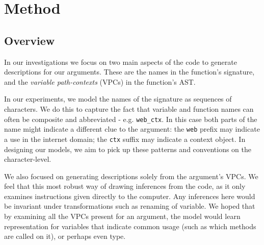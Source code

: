 \chapter{Method}
\label{the_models}



\section{Overview}

In our investigations we focus on two main aspects of the code to generate descriptions for our arguments. 
These are the names in the function's signature, and the \textit{variable path-contexts} (VPCs) in the function's AST. 


In our experiments, we model the names of the signature as sequences of characters. We do this to capture the fact that variable and function names can often be composite and abbreviated - e.g. \texttt{web_ctx}. 
In this case both parts of the name might indicate a different clue to the argument:  the  \texttt{web} prefix may indicate a use in the internet domain; the \texttt{ctx} suffix may indicate a context object. 
In designing our models, we aim to pick up these patterns and conventions on the character-level.

We also focused on generating descriptions solely from the argument's VPCs. We feel that this most robust way of drawing inferences from the code, as it only examines instructions given directly to the computer. 
Any inferences here would be invariant under transformations such as renaming of variable. 
We hoped that by examining all the VPCs present for an argument, the model would learn representation for variables that indicate common usage (such as which methods are called on it), or perhaps even type.


